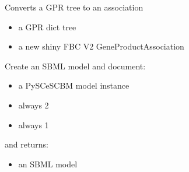 \documentclass[letterpaper,10pt,english]{sphinxmanual}
\begin{document}

\begin{fulllineitems}
\label{\detokenize{modules_doc:cbmpy.CBXML.sbml_createAssociationFromTreeV2}}
\pysigstartsignatures
{}
\pysigstopsignatures
\sphinxAtStartPar
Converts a GPR tree to an association
\begin{itemize}
\item {} 
\sphinxAtStartPar
{} a GPR dict tree

\item {} 
\sphinxAtStartPar
{} a new shiny FBC V2 GeneProductAssociation

\end{itemize}

\end{fulllineitems}


\begin{fulllineitems}
\label{\detokenize{modules_doc:cbmpy.CBXML.sbml_createModelL2}}
\pysigstartsignatures
{}
\pysigstopsignatures
\sphinxAtStartPar
Create an SBML model and document:
\begin{itemize}
\item {} 
\sphinxAtStartPar
{} a PySCeSCBM model instance

\item {} 
\sphinxAtStartPar
{} always 2

\item {} 
\sphinxAtStartPar
{} always 1

\end{itemize}

\sphinxAtStartPar
and returns:
\begin{itemize}
\item {} 
\sphinxAtStartPar
{} an SBML model

\end{itemize}

\end{fulllineitems}
\end{document}
